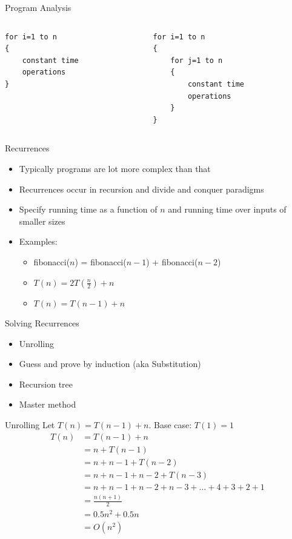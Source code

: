 \documentclass{beamer}
\begin{document}
\begin{frame}[fragile]{Program Analysis}
  \begin{columns}
    \begin{column}{0.5\textwidth}
\begin{verbatim}
for i=1 to n
{
    constant time
    operations
}
\end{verbatim}
    \end{column}
    \begin{column}{0.5\textwidth}
\begin{verbatim}
for i=1 to n
{
    for j=1 to n
    {
        constant time 
        operations 
    }
}
\end{verbatim}
    \end{column}
  \end{columns}
\end{frame}

\begin{frame}{Recurrences}
\begin{itemize}
\item Typically programs are lot more complex than that
\item Recurrences occur in recursion and divide and conquer paradigms
\item Specify running time as a function of $n$ and running time over inputs of smaller sizes
\item Examples:
\begin{itemize}
    \item fibonacci($n$) = fibonacci($n-1$) + fibonacci($n-2$)
    \item $T(n) = 2T(\frac{n}{2}) + n$
    \item $T(n) = T(n-1) + n$
\end{itemize}
\end{itemize}
\end{frame}


\begin{frame}{Solving Recurrences}
\begin{itemize}
\item Unrolling
\item Guess and prove by induction (aka Substitution)
\item Recursion tree
\item Master method
\end{itemize}
\end{frame}


\begin{frame}{Unrolling}
Let $T(n) = T(n-1) + n$. Base case: $T(1)=1$
\begin{align*}
T(n)    &= T(n-1) + n \\
        &= n + T(n-1) \\
        &= n + n-1 + T(n-2) \\
        &= n + n-1 + n-2 + T(n-3) \\
        &= n + n-1 + n-2 + n-3 + \ldots + 4 + 3 + 2 + 1 \\
        &= \frac{n(n+1)}{2} \\
        &= 0.5n^2 + 0.5n \\
        &= O(n^2)
\end{align*}
\end{frame}
\end{document}
